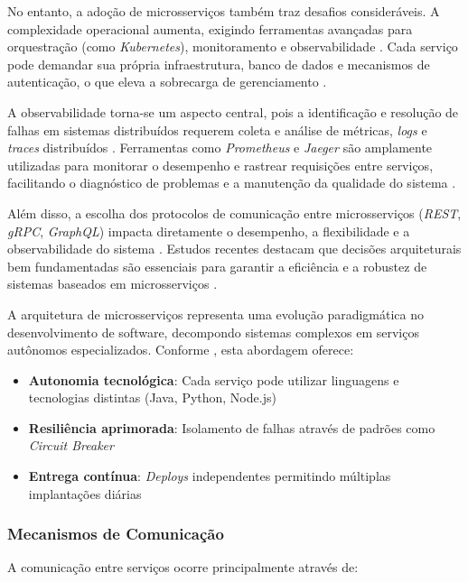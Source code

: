 No entanto, a adoção de microsserviços também traz desafios consideráveis. A complexidade operacional aumenta, exigindo ferramentas avançadas para orquestração (como \textit{Kubernetes}), monitoramento e observabilidade \cite{jamshidi2016systematic, shekhar2023microservices}. Cada serviço pode demandar sua própria infraestrutura, banco de dados e mecanismos de autenticação, o que eleva a sobrecarga de gerenciamento \cite{nizami2020comparison}.

A observabilidade torna-se um aspecto central, pois a identificação e resolução de falhas em sistemas distribuídos requerem coleta e análise de métricas, \textit{logs} e \textit{traces} distribuídos \cite{observability2023, sha2023automating}. Ferramentas como \textit{Prometheus} e \textit{Jaeger} são amplamente utilizadas para monitorar o desempenho e rastrear requisições entre serviços, facilitando o diagnóstico de problemas e a manutenção da qualidade do sistema \cite{ahmed2022observability}. 

Além disso, a escolha dos protocolos de comunicação entre microsserviços (\textit{\gls{REST}}, \textit{\gls{gRPC}}, \textit{\gls{GraphQL}}) impacta diretamente o desempenho, a flexibilidade e a observabilidade do sistema \cite{niswar2023performance}. Estudos recentes destacam que decisões arquiteturais bem fundamentadas são essenciais para garantir a eficiência e a robustez de sistemas baseados em microsserviços \cite{niswar2023performance, sha2023automating}. 

A arquitetura de microsserviços representa uma evolução paradigmática no desenvolvimento de software, decompondo sistemas complexos em serviços autônomos especializados. Conforme \cite{jamshidi2016systematic}, esta abordagem oferece:

\begin{itemize}
    \item \textbf{Autonomia tecnológica}: Cada serviço pode utilizar linguagens e tecnologias distintas (Java, Python, Node.js)
    \item \textbf{Resiliência aprimorada}: Isolamento de falhas através de padrões como \textit{Circuit Breaker}
    \item \textbf{Entrega contínua}: \textit{Deploys} independentes permitindo múltiplas implantações diárias
\end{itemize}

\subsubsection{Mecanismos de Comunicação}
A comunicação entre serviços ocorre principalmente através de:

